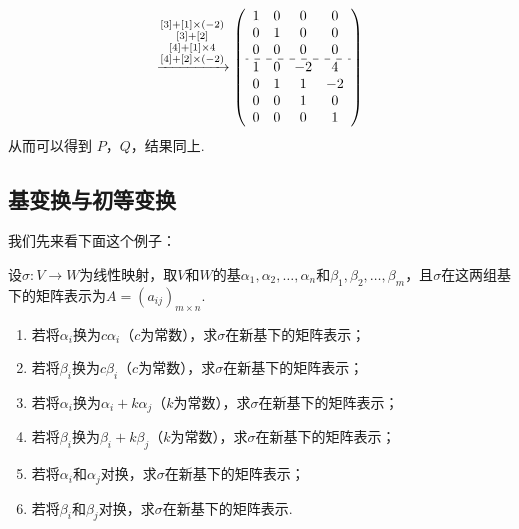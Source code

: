 \begin{solution}
\begin{enumerate}
\begin{gather*}
                  \xrightarrow{\substack{[3] + [1] \times (-2) \\ [3] + [2] \\ [4] + [1] \times 4 \\ [4] + [2] \times (-2)}}
                  \left(\begin{array}{cccc}
                      1 & 0 & 0  & 0  \\
                      0 & 1 & 0  & 0  \\
                      0 & 0 & 0  & 0  \\ \hdashline
                      1 & 0 & -2 & 4  \\
                      0 & 1 & 1  & -2 \\
                      0 & 0 & 1  & 0  \\
                      0 & 0 & 0  & 1
                  \end{array}\right)
              \end{gather*}
              从而可以得到 $P$，$Q$，结果同上.
    \end{enumerate}
\end{solution}

\subsection{基变换与初等变换}

我们先来看下面这个例子：
\begin{example}{}{}
    设$\sigma:V\to W$为线性映射，取$V$和$W$的基$\alpha_1,\alpha_2,\ldots,\alpha_n$和$\beta_1,\beta_2,\ldots,\beta_m$，且$\sigma$在这两组基下的矩阵表示为$A=(a_{ij})_{m\times n}$.
    \begin{enumerate}
        \item 若将$\alpha_i$换为$c\alpha_i$（$c$为常数），求$\sigma$在新基下的矩阵表示；

        \item 若将$\beta_i$换为$c\beta_i$（$c$为常数），求$\sigma$在新基下的矩阵表示；

        \item 若将$\alpha_i$换为$\alpha_i+k\alpha_j$（$k$为常数），求$\sigma$在新基下的矩阵表示；

        \item 若将$\beta_i$换为$\beta_i+k\beta_j$（$k$为常数），求$\sigma$在新基下的矩阵表示；

        \item 若将$\alpha_i$和$\alpha_j$对换，求$\sigma$在新基下的矩阵表示；

        \item 若将$\beta_i$和$\beta_j$对换，求$\sigma$在新基下的矩阵表示.
    \end{enumerate}
\end{example}

